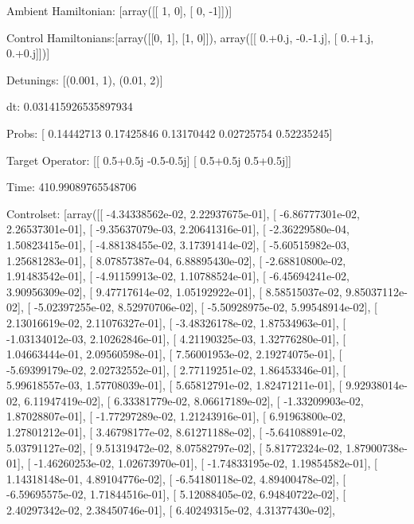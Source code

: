 \documentclass{article}
\begin{document}
    

\newpage

Ambient Hamiltonian: [array([[ 1,  0],
       [ 0, -1]])]

Control Hamiltonians:[array([[0, 1],
       [1, 0]]), array([[ 0.+0.j, -0.-1.j],
       [ 0.+1.j,  0.+0.j]])]

Detunings: [(0.001, 1), (0.01, 2)]

 dt: 0.031415926535897934

Probs: [ 0.14442713  0.17425846  0.13170442  0.02725754  0.52235245]

Target Operator: [[ 0.5+0.5j -0.5-0.5j]
 [ 0.5+0.5j  0.5+0.5j]]

Time: 410.99089765548706

Controlset: [array([[ -4.34338562e-02,   2.22937675e-01],
       [ -6.86777301e-02,   2.26537301e-01],
       [ -9.35637079e-03,   2.20641316e-01],
       [ -2.36229580e-04,   1.50823415e-01],
       [ -4.88138455e-02,   3.17391414e-02],
       [ -5.60515982e-03,   1.25681283e-01],
       [  8.07857387e-04,   6.88895430e-02],
       [ -2.68810800e-02,   1.91483542e-01],
       [ -4.91159913e-02,   1.10788524e-01],
       [ -6.45694241e-02,   3.90956309e-02],
       [  9.47717614e-02,   1.05192922e-01],
       [  8.58515037e-02,   9.85037112e-02],
       [ -5.02397255e-02,   8.52970706e-02],
       [ -5.50928975e-02,   5.99548914e-02],
       [  2.13016619e-02,   2.11076327e-01],
       [ -3.48326178e-02,   1.87534963e-01],
       [ -1.03134012e-03,   2.10262846e-01],
       [  4.21190325e-03,   1.32776280e-01],
       [  1.04663444e-01,   2.09560598e-01],
       [  7.56001953e-02,   2.19274075e-01],
       [ -5.69399179e-02,   2.02732552e-01],
       [  2.77119251e-02,   1.86453346e-01],
       [  5.99618557e-03,   1.57708039e-01],
       [  5.65812791e-02,   1.82471211e-01],
       [  9.92938014e-02,   6.11947419e-02],
       [  6.33381779e-02,   8.06617189e-02],
       [ -1.33209903e-02,   1.87028807e-01],
       [ -1.77297289e-02,   1.21243916e-01],
       [  6.91963800e-02,   1.27801212e-01],
       [  3.46798177e-02,   8.61271188e-02],
       [ -5.64108891e-02,   5.03791127e-02],
       [  9.51319472e-02,   8.07582797e-02],
       [  5.81772324e-02,   1.87900738e-01],
       [ -1.46260253e-02,   1.02673970e-01],
       [ -1.74833195e-02,   1.19854582e-01],
       [  1.14318148e-01,   4.89104776e-02],
       [ -6.54180118e-02,   4.89400478e-02],
       [ -6.59695575e-02,   1.71844516e-01],
       [  5.12088405e-02,   6.94840722e-02],
       [  2.40297342e-02,   2.38450746e-01],
       [  6.40249315e-02,   4.31377430e-02],
\end{document}
